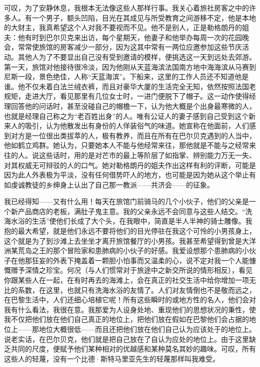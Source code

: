 \par 可叹，为了安静休息，我根本无法像这些人那样行事。我关心着旅社房客之中的许多人。有一个男子，额头凹陷，目光在其成见与所受教育之间游移不定，他是本地的大财主，我真希望这个人对我不要视而不见。他不是别人，正是勒格朗丹的姐夫：他有时到巴尔贝克来出访，每个星期天，他妻子和他举办每周一次的花园晚会，常常使旅馆的房客减少一部分，因为这其中常有一两位应邀参加这些节庆活动。其他人为了不要显出自己没有受到邀请的模样，便挑选这一天到远处去郊游。第一天，旅馆对他接待很冷淡，因为他刚从天蓝海滨法国南方地中海海滨从马赛到尼斯一段，景色绝佳，人称“天蓝海滨”。下船来，这里的工作人员还不知道他是谁。他不仅未着白法兰绒衣裤，而且对豪华大厦的生活完全无知，依然按照法国老规矩，走进大厅，看见那里有几位女士时，一进门便脱下了帽子。这一动作使得经理回答他的问话时，甚至没碰自己的帽檐一下，认为他大概是个出身最寒微的人，也就是经理自己称之为“老百姓出身”的人。唯有公证人的妻子感到自己受到这个新来人的吸引，认为他散发出有身份的人佯装俗气的味道。她宣称在他面前，人们感到对方是一位很出类拔萃的人，极有教养，而且在所有在巴尔贝克遇到的人当中，他如鹤立鸡群。她认为，只要她本人不能与他经常来往，那他就是不能与之经常来往的人。说这些话时，用的是对芒市的最上等阶层了如指掌、辨别能力万无一失、对其权威无可辩驳的人的口气。她对勒格朗丹的姐夫作出这样有利的评断，可能是因为此人外表极为平淡，没有任何借势吓人的地方，也可能是因为她从这个举止有如虔诚教徒的乡绅身上认出了自己那一教派——共济会——的征象。
\par 我已经得知——又有什么用！每天在旅馆门前骑马的几个小伙子，他们的父亲是一个新产品商店的老板，满肚子鬼主意。我的父亲永远不会同意与这些人结交。“洗海水浴的生活”使他们长成了大个头，在我眼中，简直是半人半神的骑士雕像。我抱的最大希望，就是他们永远不要将他们的目光停驻在我这个可怜的小男孩身上，这个就是为了到沙滩上去坐坐才离开旅馆餐厅的小男孩。我甚至希望得到曾是大洋洲某荒岛之王的那个冒险家和患肺病的小伙子的好感。我爱设想那个患肺病的小伙子在他那狂妄的外表下掩盖着一颗胆小怕事而又温柔的心，说不定对我一个人能慷慨赠予深情之珍宝。何况（与人们惯常对于旅途中之新交所说的情形相反），看见你跟某些人在一起，在有时再去的海滩上，会在真正的社交生活中给你增加一项无比的系数，在这里，也就只有洗海水浴的友情了。人们对友情倒也不是敬而远之，在巴黎生活中，人们还细心培植它呢！所有这些瞬时的或地方性的名人，他们会对我有什么看法，我很在意。我那爱为人设身处地、重现他们的思想状况的秉性，使我不仅把他们放在他们自己真正的地位上，把他们放在假如在巴黎他们会占据的地位上——那地位大概很低——而且还把他们放在他们自己认为应该处于的地位上。说老实话，在巴尔贝克，他们就是把自己放在了自认为应处的地位上。由于这里缺乏共同的尺度，便赋予他们某种相对的优越感和某种莫名其妙的趣味。可叹，所有这些人的轻蔑，没有一个比德·斯特马里亚先生的轻蔑那样叫我难受。
